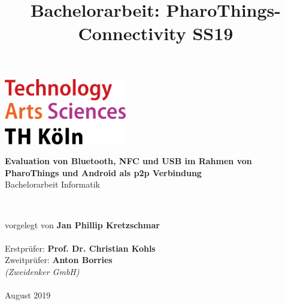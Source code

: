 

\title{Bachelorarbeit: PharoThings-Connectivity SS19}

	\begin{titlepage}
    \includegraphics[width=0.4\textwidth]{../latex-ai-project/th_logo.png}
    ~\\[2.5cm]
    \begin{center}
    \textbf{\huge Evaluation von Bluetooth, NFC und USB im Rahmen von PharoThings und Android als p2p Verbindung}\\[0.5cm]
    {\Large Bachelorarbeit Informatik}
    \vfill
    \end{center}
    ~\\[2.0cm]
    \begin{flushright}
    {\large vorgelegt von {\bf Jan Phillip Kretzschmar}}\\[0.1cm]
    ~\\[1.5cm]
    {\large Erstprüfer: {\bf Prof. Dr. Christian Kohls}}
    ~\\[0.75cm]
    {\large Zweitprüfer: {\bf Anton Borries}}\\[0.1cm]
    {\large {\it (Zweidenker GmbH)}}\\[0.1cm]

	~\\[1.25cm]
    {\large August 2019}
	\end{flushright}
	\end{titlepage}
	\pagebreak
